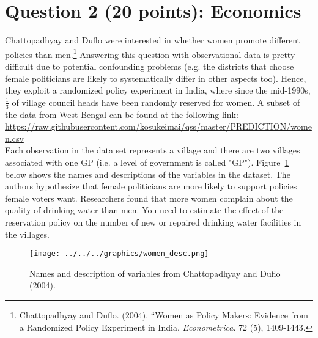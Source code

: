 \documentclass[12pt,letterpaper]{article}
\begin{document}
\section*{Question 2 (20 points): Economics}
Chattopadhyay and Duflo were interested in whether women promote different policies than men.\footnote{Chattopadhyay and Duflo. (2004). ``Women as Policy Makers: Evidence from a Randomized Policy Experiment in India. \textit{Econometrica}. 72 (5), 1409-1443.} Answering this question with observational data is pretty difficult due to potential confounding problems (e.g. the districts that choose female politicians are likely to systematically differ in other aspects too). Hence, they exploit a randomized policy experiment in India, where since the mid-1990s, $\frac{1}{3}$ of village council heads have been randomly reserved for women. A subset of the data from West Bengal can be found at the following link: \url{https://raw.githubusercontent.com/kosukeimai/qss/master/PREDICTION/women.csv}\\

\noindent Each observation in the data set represents a village and there are two villages associated with one GP (i.e. a level of government is called "GP"). Figure~\ref{fig:women_desc} below shows the names and descriptions of the variables in the dataset. The authors hypothesize that female politicians are more likely to support policies female voters want. Researchers found that more women complain about the quality of drinking water than men. You need to estimate the effect of the reservation policy on the number of new or repaired drinking water facilities in the villages.
\vspace{.5cm}
\begin{figure}[h!]
	\caption{\footnotesize{Names and description of variables from Chattopadhyay and Duflo (2004).}}
	\vspace{.5cm}
	\centering
	\label{fig:women_desc}
	\texttt{[image: ../../../graphics/women\_desc.png]}
\end{figure}		
\end{document}
